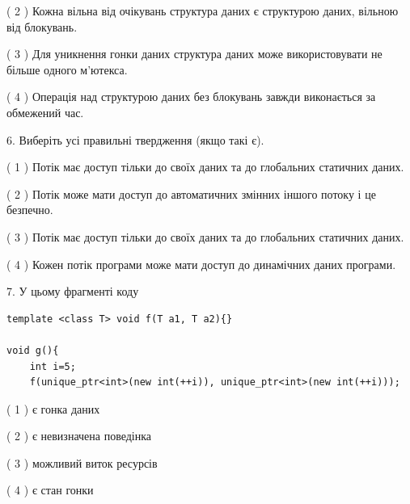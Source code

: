 \documentclass[12pt, ukrainian]{article}
\begin{document}
\begin {large}
{( 2 ) Кожна вільна від очікувань структура даних є структурою даних, вільною від блокувань.%

( 3 ) Для уникнення гонки даних структура даних може використовувати не більше одного м’ютекса.%

( 4 ) Операція над структурою даних без блокувань завжди виконається за обмежений час.%
\newpage



\vspace{5mm}
6. Виберіть усі правильні твердження (якщо такі є).\par
\vspace{2mm}

( 1 ) Потік має доступ тільки до своїх даних та до глобальних статичних даних.%

( 2 ) Потік може мати доступ до автоматичних змінних іншого потоку і це безпечно.%

( 3 ) Потік має доступ тільки до своїх даних та до глобальних статичних даних.%

( 4 ) Кожен потік програми може мати доступ до динамічних даних програми.%


\vspace{5mm}
7. У цьому фрагменті коду
\begin{verbatim}
template <class T> void f(T a1, T a2){}

void g(){
    int i=5;
    f(unique_ptr<int>(new int(++i)), unique_ptr<int>(new int(++i)));
\end{verbatim}

( 1 ) є гонка даних%

( 2 ) є невизначена поведінка%

( 3 ) можливий виток ресурсів%

( 4 ) є стан гонки%
}
\end {large}
\end{document}
